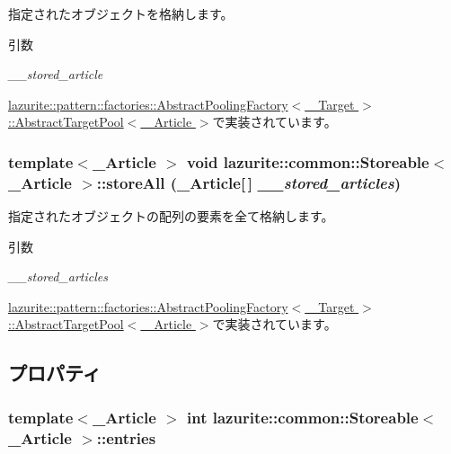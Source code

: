 指定されたオブジェクトを格納します。 
\begin{DoxyParams}{引数}
\item[{\em \_\-\_\-stored\_\-article}]\end{DoxyParams}


\hyperlink{classlazurite_1_1pattern_1_1factories_1_1_abstract_pooling_factory_3_01___target_01_4_1_1_abstra513b29652c04fa77de240c337e958a8d_a2d11e4ff0f0cdb377a20750454d562b7}{lazurite::pattern::factories::AbstractPoolingFactory$<$ \_\-Target $>$::AbstractTargetPool$<$ \_\-Article $>$}で実装されています。\hypertarget{interfacelazurite_1_1common_1_1_storeable_3_01___article_01_4_ae96e27826bb2346355b9a2c226f80276}{
\subsubsection[{storeAll}]{\setlength{\rightskip}{0pt plus 5cm}template$<$\_\-Article $>$ void lazurite::common::Storeable$<$ \_\-Article $>$::storeAll (\_\-Article\mbox{[}$\,$\mbox{]} {\em \_\-\_\-stored\_\-articles})}}
\label{interfacelazurite_1_1common_1_1_storeable_3_01___article_01_4_ae96e27826bb2346355b9a2c226f80276}


指定されたオブジェクトの配列の要素を全て格納します。 
\begin{DoxyParams}{引数}
\item[{\em \_\-\_\-stored\_\-articles}]\end{DoxyParams}


\hyperlink{classlazurite_1_1pattern_1_1factories_1_1_abstract_pooling_factory_3_01___target_01_4_1_1_abstra513b29652c04fa77de240c337e958a8d_a7b249c9e345439ad7e583aa71225e5fd}{lazurite::pattern::factories::AbstractPoolingFactory$<$ \_\-Target $>$::AbstractTargetPool$<$ \_\-Article $>$}で実装されています。

\subsection{プロパティ}
\hypertarget{interfacelazurite_1_1common_1_1_storeable_3_01___article_01_4_a3af6673c4d90f17fc0bf623319962692}{
\subsubsection[{entries}]{\setlength{\rightskip}{0pt plus 5cm}template$<$\_\-Article $>$ int lazurite::common::Storeable$<$ \_\-Article $>$::entries}}
\label{interfacelazurite_1_1common_1_1_storeable_3_01___article_01_4_a3af6673c4d90f17fc0bf623319962692}


